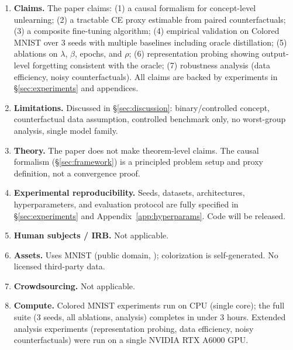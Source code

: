 \documentclass{article}
\begin{document}
\begin{enumerate}[leftmargin=1.5em]

\item \textbf{Claims.}
The paper claims: (1) a causal formalism for concept-level unlearning;
(2) a tractable CE proxy estimable from paired counterfactuals;
(3) a composite fine-tuning algorithm; (4) empirical validation on Colored MNIST
over 3 seeds with multiple baselines including oracle distillation;
(5) ablations on $\lambda$, $\beta$, epochs, and $\rho$; (6) representation
probing showing output-level forgetting consistent with the oracle;
(7) robustness analysis (data efficiency, noisy counterfactuals).
All claims are backed by experiments in \S\ref{sec:experiments} and appendices.

\item \textbf{Limitations.}
Discussed in \S\ref{sec:discussion}: binary/controlled concept, counterfactual
data assumption, controlled benchmark only, no worst-group analysis, single
model family.

\item \textbf{Theory.}
The paper does not make theorem-level claims.  The causal formalism
(\S\ref{sec:framework}) is a principled problem setup and proxy definition,
not a convergence proof.

\item \textbf{Experimental reproducibility.}
Seeds, datasets, architectures, hyperparameters, and evaluation protocol are
fully specified in \S\ref{sec:experiments} and Appendix~\ref{app:hyperparams}.
Code will be released.

\item \textbf{Human subjects / IRB.}  Not applicable.

\item \textbf{Assets.}  Uses MNIST (public domain, \citet{lecun1998mnist});
colorization is self-generated.  No licensed third-party data.

\item \textbf{Crowdsourcing.}  Not applicable.

\item \textbf{Compute.}
Colored MNIST experiments run on CPU (single core); the full suite (3 seeds,
all ablations, analysis) completes in under 3 hours.  Extended analysis
experiments (representation probing, data efficiency, noisy counterfactuals)
were run on a single NVIDIA RTX A6000 GPU.

\end{enumerate}
\end{document}
